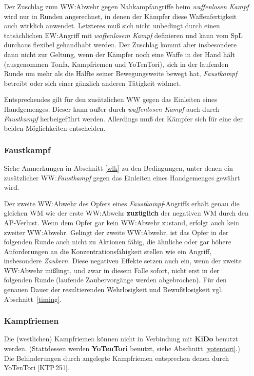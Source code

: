 \documentclass[10pt,a4paper,germanpar]{article}
\begin{document}
Der Zuschlag zum WW:Abwehr gegen Nahkampfangriffe beim
\emph{waffenlosen Kampf} wird nur in Runden angerechnet, in denen der
Kämpfer diese Waffenfertigkeit auch wirklich anwendet. Letzteres muß
sich nicht unbedingt durch einen tatsächlichen EW:Angriff mit
\emph{waffenlosem Kampf} definieren und kann vom SpL durchaus flexibel
gehandhabt werden. Der Zuschlag kommt aber insbesondere dann nicht zur
Geltung, wenn der Kämpfer noch eine Waffe in der Hand hält
(ausgenommen Tonfa, Kampfriemen und YoTenTori), sich in der laufenden
Runde um mehr als die Hälfte seiner Bewegungsweite bewegt hat,
\emph{Faustkampf} betreibt oder sich einer gänzlich anderen Tätigkeit
widmet.

Entsprechendes gilt für den zusätzlichen WW gegen das Einleiten eines
Handgemenges. Dieser kann außer durch \emph{waffenlosen Kampf} auch
durch \emph{Faustkampf} herbeigeführt werden. Allerdings muß der
Kämpfer sich für eine der beiden Möglichkeiten entscheiden.

\subsubsection{Faustkampf}

Siehe Anmerkungen in Abschnitt \ref{wlk} zu den Bedingungen, unter
denen ein zusätzlicher WW:\emph{Faustkampf} gegen das Einleiten eines
Handgemenges gewährt wird.

Der zweite WW:Abwehr des Opfers eines \emph{Faustkampf}-Angriffs
erhält genau die gleichen WM wie der erste WW:Abwehr
\textbf{zuzüglich} der negativen WM durch den AP-Verlust. Wenn dem
Opfer gar kein WW:Abwehr zustand, erfolgt auch kein zweiter
WW:Abwehr. Gelingt der zweite WW:Abwehr, ist das Opfer in der
folgenden Runde auch nicht zu Aktionen fähig, die ähnliche oder gar
höhere Anforderungen an die Konzentrationsfähigkeit stellen wie ein
Angriff, insbesondere \emph{Zaubern}. Diese negativen Effekte setzen
auch ein, wenn der zweite WW:Abwehr mißlingt, und zwar in diesem Falle
sofort, nicht erst in der folgenden Runde (laufende Zaubervorgänge
werden abgebrochen). Für den genauen Dauer der resultierenden
Wehrlosigkeit und Bewußtlosigkeit vgl. Abschnitt~\ref{timing}.

\subsubsection{Kampfriemen}

Die (westlichen) Kampfriemen können nicht in Verbindung mit
\textbf{KiDo} benutzt werden. (Stattdessen werden \textbf{YoTenTori}
benutzt, siehe Abschnitt \ref{yotentori}.) Die Behinderungen durch
angelegte Kampfriemen entsprechen denen durch YoTenTori [KTP\,251].
\end{document}
